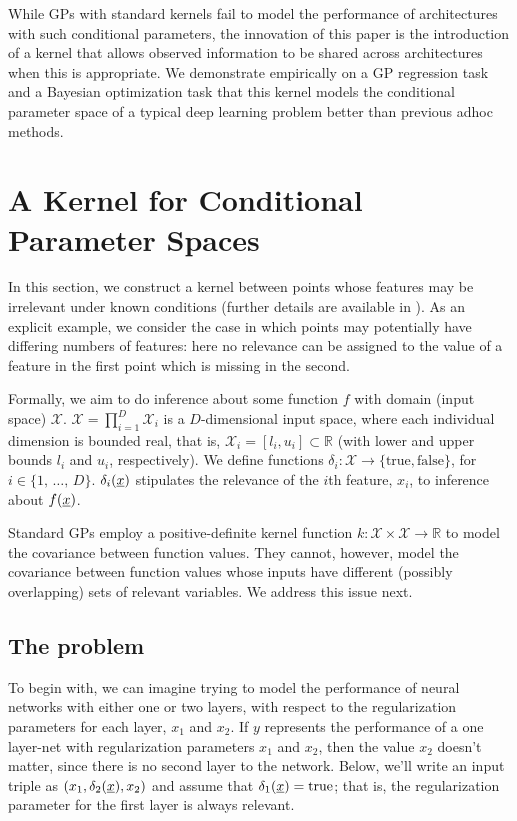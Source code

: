 \documentclass{article}
\newcommand{\vect}[1]{\underline{\smash{#1}}}
\renewcommand{\v}[1]{\vect{#1}}
\newcommand{\reals}{\mathds{R}}
\newcommand{\sX}{\mathcal{X}}
\begin{document}
While GPs with standard kernels fail to model the performance of architectures with such conditional parameters, the innovation of this paper is the introduction of a kernel that allows observed information to be shared across architectures when this is appropriate. We demonstrate empirically on a GP regression task and a Bayesian optimization task that this kernel models the conditional parameter space of a typical deep learning problem better than previous adhoc methods. 


\section{A Kernel for Conditional Parameter Spaces}
In this section, we construct a kernel between points whose features may be irrelevant under known conditions (further details are available in \cite{arxiv_hierarchical_kernel}). As an explicit example, we consider the case in which points may potentially have differing numbers of features: here no relevance can be assigned to the value of a feature in the first point which is missing in the second. 

Formally, we aim to do inference about some function $f$ with domain (input space) $\sX$. $\sX = \prod_{i=1}^D \sX_i$ is a $D$-dimensional input space, where each individual dimension is bounded real, that is, $\sX_i = [l_i, u_i] \subset \reals$ (with lower and upper bounds $l_i$ and $u_i$, respectively). We define functions $\delta_i\colon \sX\to \{\text{true}, \text{false}\}$, for $i \in \{1,\,\ldots,\,D\}$. $\delta_i(\v{x})$ stipulates the relevance of the $i$th feature, $x_i$, to inference about $f(\v{x})$.

Standard GPs employ a positive-definite kernel function $k: \sX \times \sX \rightarrow \mathbb{R}$ to model the covariance between function values. They cannot, however, model the covariance between function values whose inputs have different (possibly overlapping) sets of relevant variables. We address this issue next.

\subsection{The problem}
To begin with, we can imagine trying to model the performance of neural networks with either one or two layers, with respect to the regularization parameters for each layer, $x_1$ and $x_2$.  If $y$ represents the performance of a one layer-net with regularization parameters $x_1$ and $x_2$, then the value $x_2$ doesn't matter, since there is no second layer to the network. Below, we'll write an input triple as $(x_1, \delta_2(\v{x}), x_2)$ and assume that $\delta_1(\v{x}) = \text{true}$; that is, the regularization parameter for the first layer is always relevant. 
\end{document}
